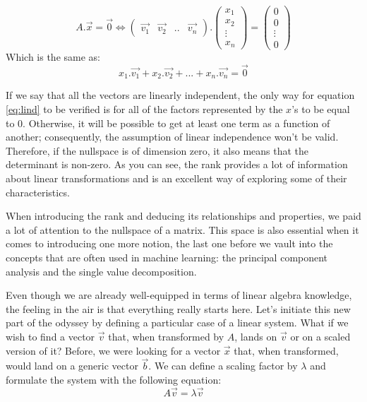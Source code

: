 \documentclass[600paper, 11pt,twoside,openany]{kdp}
\begin{document}
\[
A.\overrightarrow{x} = \overrightarrow{0} \Leftrightarrow \begin{pmatrix}
\overrightarrow{v_1} & \overrightarrow{v_2} & .. & \overrightarrow{v_n}
\end{pmatrix}
.\begin{pmatrix}
x_1\\
x_2\\
\vdots\\
x_n
\end{pmatrix} = \begin{pmatrix}
0\\
0\\
\vdots\\
0
\end{pmatrix}
\]
\indent Which is the same as:
\begin{equation}\label{eq:lind}
x_1.\overrightarrow{v_1} + x_2.\overrightarrow{v_2} + ... + x_n.\overrightarrow{v_n} = \overrightarrow{0} 
\end{equation}
\par 
\vspace{-3pt}
\indent If we say that all the vectors are linearly independent, the only way for equation \ref{eq:lind} to be verified is for all of the factors represented by the $x$'s to be equal to 0. Otherwise, it will be possible to get at least one term as a function of another; consequently, the assumption of linear independence won’t be valid. Therefore, if the nullspace is of dimension zero, it also means that the determinant is non-zero. As you can see, the rank provides a lot of information about linear transformations and is an excellent way of exploring some of their characteristics. 
\par 
\vspace{-3pt}
\indent When introducing the rank and deducing its relationships and properties, we paid a lot of attention to the nullspace of a matrix. This space is also essential when it comes to introducing one more notion, the last one before we vault into the concepts that are often used in machine learning: the principal component analysis and the single value decomposition. 
\par 
\vspace{-3pt}
\indent Even though we are already well-equipped in terms of linear algebra knowledge, the feeling in the air is that everything really starts here. Let’s initiate this new part of the odyssey by defining a particular case of a linear system. What if we wish to find a vector $\overrightarrow{v}$ that, when transformed by $A$, lands on $\overrightarrow{v}$ or on a scaled version of it? Before, we were looking for a vector $\overrightarrow{x}$ that, when transformed, would land on a generic vector $\overrightarrow{b}$. We can define a scaling factor by $\lambda$ and formulate the system with the following equation:
\begin{equation}\label{eq:eigen}
A\overrightarrow{v} = \lambda \overrightarrow{v}
\end{equation}
\end{document}
